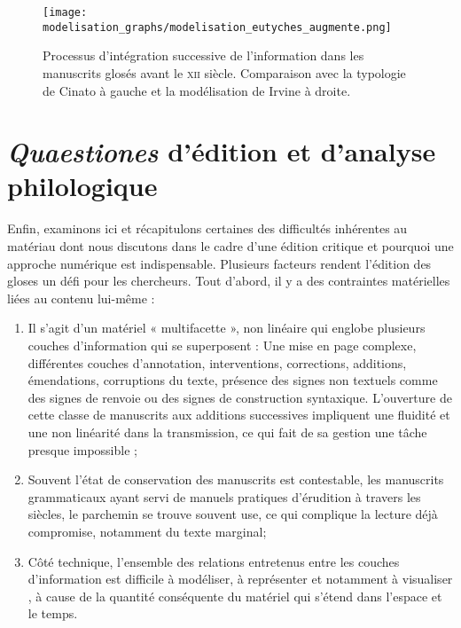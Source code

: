 \documentclass[a4paper, twoside, 12pt]{book}
\begin{document}
\begin{figure}[H]
    \centering
    \texttt{[image: modelisation\_graphs/modelisation\_eutyches\_augmente.png]}
    \caption{Processus d'intégration successive de l'information dans les manuscrits glosés avant le \textsc{xii}\ieme{} siècle. Comparaison avec la typologie de Cinato à gauche et la modélisation de Irvine à droite.}
    \label{irvine_cinato}
\end{figure}

\section{\textit{Quaestiones} d'édition et d'analyse philologique}


Enfin, examinons ici et récapitulons certaines des difficultés inhérentes au matériau dont nous discutons dans le cadre d'une édition critique et pourquoi une approche numérique est indispensable. Plusieurs facteurs rendent l'édition des gloses un défi pour les chercheurs. Tout d'abord, il y a des contraintes matérielles liées au contenu lui-même :\\

\begin{enumerate}
    \item Il s'agit d'un matériel « multifacette », non linéaire qui englobe plusieurs couches d'information qui se superposent : Une mise en page complexe, différentes couches d’annotation, interventions, corrections, additions, émendations, corruptions du texte, présence des signes non textuels comme des signes de renvoie ou des signes de construction syntaxique. L'ouverture de cette classe de manuscrits aux additions successives impliquent une fluidité et une non linéarité dans la transmission, ce qui fait de sa gestion une tâche presque impossible ;
    \item Souvent l'état de conservation des manuscrits est contestable, les manuscrits grammaticaux ayant servi de manuels pratiques d'érudition à travers les siècles, le parchemin se trouve souvent use, ce qui complique la lecture déjà compromise, notamment du texte marginal;
    \item Côté technique, l'ensemble des relations entretenus entre les couches d'information est difficile à modéliser, à représenter et notamment à visualiser , à cause de la quantité conséquente du matériel qui s'étend dans l'espace et le temps.
\end{enumerate}
\end{document}
